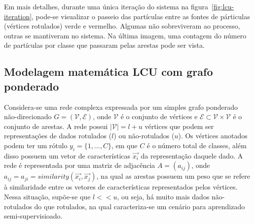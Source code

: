 Em mais detalhes, durante uma única iteração do sistema na
figura~\ref{fig:lcu-iteration}, pode-se visualizar o passeio das
partículas entre as fontes de párticulas (vértices rotulados) verde e
vermelho. Algumas não sobreviveram ao processo, outras se mantiveram
no sistema. Na última imagem, uma contagem do número de partículas por
classe que passaram pelas arestas pode ser vista.


\begin{figure}[h!]
        \captionsetup{width=8cm}
		\centering
\end{figure}


\subsection{Modelagem matemática LCU com grafo ponderado}\label{sec:lcu-math}

Considera-se uma rede complexa expressada por um simples grafo
ponderado não-direcionado $G = (\mathcal{V}, \mathcal{E})$, onde $\mathcal{V}$ é o conjunto de
vértices e $\mathcal{E} \subset \mathcal{V} \times \mathcal{V}$ é o conjunto de arestas. A rede possui
$\left|\mathcal{V}\right| = l + u$ vértices que podem ser representações de
dados rotulados ($ l $) ou não-rotulados ($ u $). Os vértices anotados
podem ter um rótulo $y_i = \{1, \ldots, C\}$, em que $C$ é o número total de
classes, além disso possuem um vetor de características $\vec{x_i}$ da
representação daquele dado. A rede é representada por uma matriz de
adjacência $A = (a_{ij})$, onde $a_{ij} =a_{ji} =
similarity(\vec{x_i}, \vec{x_j})$, na qual as arestas possuem um peso
que se refere à similaridade entre os vetores de características
representados pelos vértices. Nessa situação, supõe-se que $l << u$,
ou seja, há muito mais dados não-rotulados do que rotulados, na qual
caracteriza-se um cenário para aprendizado semi-supervisioado.

